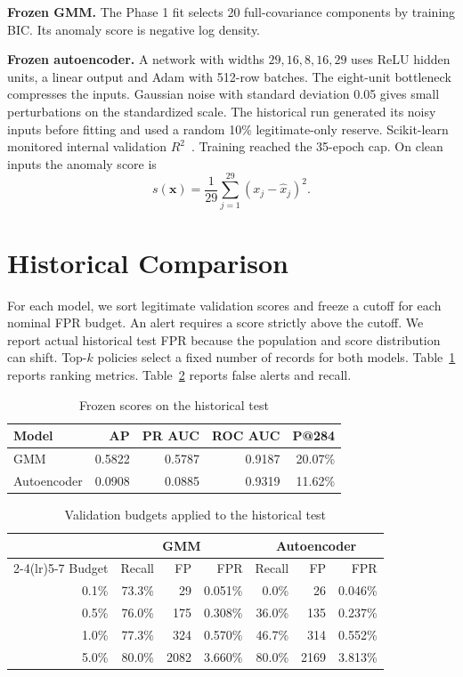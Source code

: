\documentclass[conference]{IEEEtran}
\begin{document}
\textbf{Frozen GMM.} The Phase 1 fit selects 20 full-covariance components by training BIC. Its anomaly score is negative log density.

\textbf{Frozen autoencoder.} A network with widths $29,16,8,16,29$ uses ReLU hidden units, a linear output and Adam with 512-row batches. The eight-unit bottleneck compresses the inputs. Gaussian noise with standard deviation 0.05 gives small perturbations on the standardized scale. The historical run generated its noisy inputs before fitting and used a random 10\% legitimate-only reserve. Scikit-learn monitored internal validation $R^2$~\cite{sklearn}. Training reached the 35-epoch cap. On clean inputs the anomaly score is
\begin{equation}
s(\mathbf{x})=\frac{1}{29}\sum_{j=1}^{29}(x_j-\hat{x}_j)^2.
\end{equation}

\section{Historical Comparison}
For each model, we sort legitimate validation scores and freeze a cutoff for each nominal FPR budget. An alert requires a score strictly above the cutoff. We report actual historical test FPR because the population and score distribution can shift. Top-$k$ policies select a fixed number of records for both models. Table~\ref{tab:rank} reports ranking metrics. Table~\ref{tab:fpr} reports false alerts and recall.

\begin{table}[t]\centering
\caption{Frozen scores on the historical test}\label{tab:rank}
\begin{tabular}{lrrrr}
\toprule
Model & AP & PR AUC & ROC AUC & P@284 \\
\midrule
GMM & 0.5822 & 0.5787 & 0.9187 & 20.07\% \\
Autoencoder & 0.0908 & 0.0885 & 0.9319 & 11.62\% \\
\bottomrule
\end{tabular}
\end{table}

\begin{table}[t]\centering
\caption{Validation budgets applied to the historical test}\label{tab:fpr}
\begin{tabular}{rrrrrrr}
\toprule
& \multicolumn{3}{c}{GMM} & \multicolumn{3}{c}{Autoencoder} \\
\cmidrule(lr){2-4}\cmidrule(lr){5-7}
Budget & Recall & FP & FPR & Recall & FP & FPR \\
\midrule
0.1\% & 73.3\% & 29 & 0.051\% & 0.0\% & 26 & 0.046\% \\
0.5\% & 76.0\% & 175 & 0.308\% & 36.0\% & 135 & 0.237\% \\
1.0\% & 77.3\% & 324 & 0.570\% & 46.7\% & 314 & 0.552\% \\
5.0\% & 80.0\% & 2082 & 3.660\% & 80.0\% & 2169 & 3.813\% \\
\bottomrule
\end{tabular}
\end{table}
\end{document}
